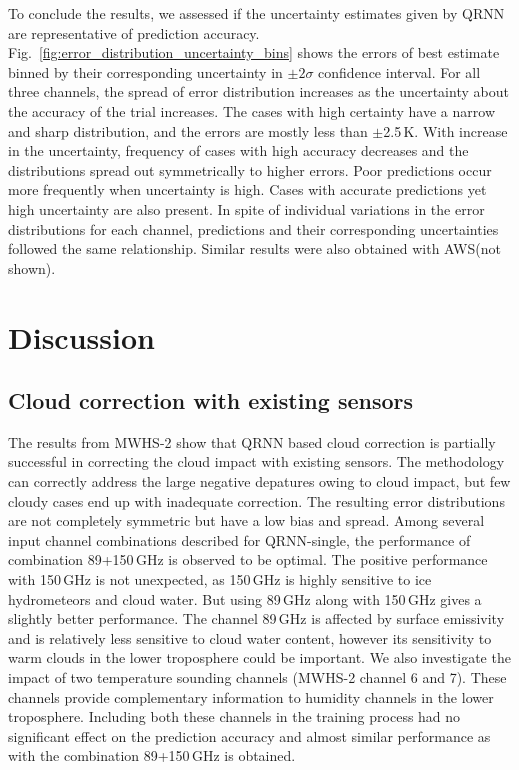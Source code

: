 \documentclass[amt, manuscript]{copernicus}
\begin{document}
To conclude the results, we assessed if the uncertainty estimates given by QRNN are representative of prediction accuracy. Fig.~\ref{fig:error_distribution_uncertainty_bins} shows the errors of best estimate binned by their corresponding uncertainty in $\pm2\sigma$  confidence interval. For all three channels, the spread of error distribution increases as the uncertainty about the accuracy of the trial increases. The cases with high certainty have a narrow and sharp distribution, and the errors are mostly less than $\pm$2.5\,K. With increase in the uncertainty, frequency of cases with high accuracy decreases and the distributions spread out symmetrically to higher errors. Poor predictions occur more frequently when uncertainty is high. Cases with accurate predictions yet high uncertainty are also present. In spite of individual variations in the error distributions for each channel, predictions and their corresponding uncertainties followed the same relationship. Similar results were also obtained with AWS(not shown). 


\section{Discussion}

\subsection{Cloud correction with existing sensors}
%
The results from MWHS-2 show that QRNN based cloud correction is partially successful in correcting the cloud impact with existing sensors. The methodology can correctly address the large negative depatures owing to cloud impact, but few cloudy cases end up with inadequate correction. The resulting error distributions are not completely symmetric but have a low bias and spread. Among several input channel combinations described for QRNN-single, the performance of combination 89+150\,GHz is observed to be optimal. The positive performance with 150\,GHz is not unexpected, as 150\,GHz is highly sensitive to ice hydrometeors and cloud water. But using 89\,GHz along with 150\,GHz gives a slightly better performance. The channel 89\,GHz is affected by surface emissivity and is relatively less sensitive to cloud water content, however its sensitivity to warm clouds in the lower troposphere could be important. We also investigate the impact of two temperature sounding channels (MWHS-2 channel 6 and 7). These channels provide complementary information to humidity channels in the lower troposphere. Including both these channels in the training process had no significant effect on the prediction accuracy and almost similar performance as with the combination 89+150\,GHz is obtained. 
\end{document}
